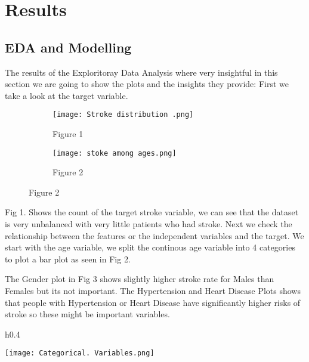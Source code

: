\documentclass{article}
\begin{document}
\section{Results }
\subsection{EDA and Modelling}
The results of the Exploritoray Data Analysis where very insightful in this section we are going to show the plots and the insights they provide:  First we take a look at the target variable.





\begin{figure}[h]
     \centering
     \begin{subfigure}[b]{0.25\textwidth}
         \centering
         \texttt{[image: Stroke distribution .png]}
          \captionsetup{labelformat=empty}

         \caption{Figure 1}
        
  
     \end{subfigure}
     \hfill
     \begin{subfigure}[b]{0.25\textwidth}
         \centering
         \texttt{[image: stoke among ages.png]}
         \captionsetup{labelformat=empty}
         \caption{Figure 2}
       

    
     \end{subfigure}
     \hfill

\end{figure}
Fig 1. Shows the count of the target stroke variable, we can see that the dataset is very unbalanced with very little patients who had stroke. Next we check the relationship between the features or the independent variables and the target. We start with the age variable, we split the continous age variable into 4 categories to plot a bar plot as seen in Fig 2.


The Gender plot in Fig 3 shows slightly higher stroke rate for Males than Females but its not important. The Hypertension and Heart Disease Plots shows that people with Hypertension or Heart Disease have significantly higher risks of stroke so these might be important variables.


\begin{wrapfigure}{h}{0.4\textwidth}

\texttt{[image: Categorical. Variables.png]} 
   \captionsetup{labelformat=empty}
\caption{Figure 3}
\end{wrapfigure}
\end{document}
